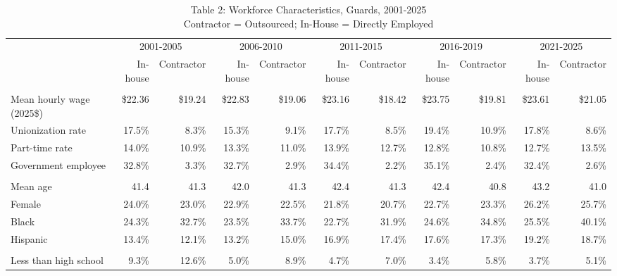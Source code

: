 \begin{table}[!t]
\caption*{
{\large Table 2: Workforce Characteristics, Guards, 2001-2025} \\
{\small Contractor = Outsourced; In-House = Directly Employed}
} 

\fontsize{10.0pt}{12.0pt}\selectfont

\begin{tabular*}{\linewidth}{@{\extracolsep{\fill}}l|rrrrrrrrrr}
\toprule
  & \multicolumn{2}{c}{2001-2005} & \multicolumn{2}{c}{2006-2010} & \multicolumn{2}{c}{2011-2015} & \multicolumn{2}{c}{2016-2019} & \multicolumn{2}{c}{2021-2025} \\ 
\cmidrule(lr){2-3} \cmidrule(lr){4-5} \cmidrule(lr){6-7} \cmidrule(lr){8-9} \cmidrule(lr){10-11}
  & In-house & Contractor & In-house & Contractor & In-house & Contractor & In-house & Contractor & In-house & Contractor \\ 
\midrule\addlinespace[2.5pt]
\multicolumn{11}{l}{Employment and wages} \\[2.5pt] 
\midrule\addlinespace[2.5pt]
Mean hourly wage (2025\$) & \$22.36 & \$19.24 & \$22.83 & \$19.06 & \$23.16 & \$18.42 & \$23.75 & \$19.81 & \$23.61 & \$21.05 \\
Unionization rate & 17.5\% & 8.3\% & 15.3\% & 9.1\% & 17.7\% & 8.5\% & 19.4\% & 10.9\% & 17.8\% & 8.6\% \\
Part-time rate & 14.0\% & 10.9\% & 13.3\% & 11.0\% & 13.9\% & 12.7\% & 12.8\% & 10.8\% & 12.7\% & 13.5\% \\
Government employee & 32.8\% & 3.3\% & 32.7\% & 2.9\% & 34.4\% & 2.2\% & 35.1\% & 2.4\% & 32.4\% & 2.6\% \\
\midrule\addlinespace[2.5pt]
\multicolumn{11}{l}{Demographics} \\[2.5pt] 
\midrule\addlinespace[2.5pt]
Mean age & 41.4 & 41.3 & 42.0 & 41.3 & 42.4 & 41.3 & 42.4 & 40.8 & 43.2 & 41.0 \\
Female & 24.0\% & 23.0\% & 22.9\% & 22.5\% & 21.8\% & 20.7\% & 22.7\% & 23.3\% & 26.2\% & 25.7\% \\
Black & 24.3\% & 32.7\% & 23.5\% & 33.7\% & 22.7\% & 31.9\% & 24.6\% & 34.8\% & 25.5\% & 40.1\% \\
Hispanic & 13.4\% & 12.1\% & 13.2\% & 15.0\% & 16.9\% & 17.4\% & 17.6\% & 17.3\% & 19.2\% & 18.7\% \\
\midrule\addlinespace[2.5pt]
\multicolumn{11}{l}{Education} \\[2.5pt] 
\midrule\addlinespace[2.5pt]
Less than high school & 9.3\% & 12.6\% & 5.0\% & 8.9\% & 4.7\% & 7.0\% & 3.4\% & 5.8\% & 3.7\% & 5.1\% \\

\end{tabular*}
\end{table}
